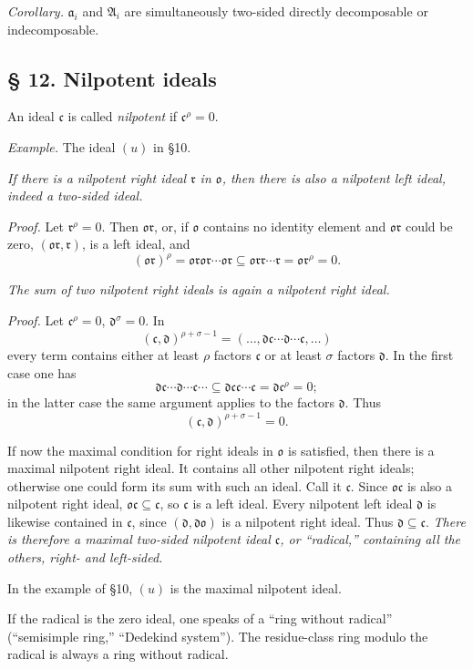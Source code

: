 \documentclass[11pt]{article}
\providecommand{\mA}{\mathfrak{A}}
\providecommand{\mo}{\mathfrak{o}}
\providecommand{\ma}{\mathfrak{a}}
\providecommand{\mc}{\mathfrak{c}}
\providecommand{\md}{\mathfrak{d}}
\providecommand{\mr}{\mathfrak{r}}
\begin{document}
\emph{Corollary.} $\ma_i$ and $\mA_i$ are simultaneously two-sided directly decomposable or indecomposable.

\subsection*{§ 12. Nilpotent ideals}

An ideal $\mc$ is called \emph{nilpotent} if $\mc^\rho=0$.

\emph{Example.} The ideal $(u)$ in §10.

\emph{If there is a nilpotent right ideal $\mr$ in $\mo$, then there is also a nilpotent left ideal, indeed a two-sided ideal.}

\emph{Proof.} Let $\mr^\rho=0$. Then $\mo\mr$, or, if $\mo$ contains no identity element and $\mo\mr$ could be zero, $(\mo\mr,\mr)$, is a left ideal, and
\[
        (\mo\mr)^\rho=\mo\mr\mo\mr\cdots\mo\mr\subseteq\mo\mr\mr\cdots\mr=\mo\mr^\rho=0.
\]

\emph{The sum of two nilpotent right ideals is again a nilpotent right ideal.}

\emph{Proof.} Let $\mc^\rho=0$, $\md^\sigma=0$. In
\[
        (\mc,\md)^{\rho+\sigma-1}=(\ldots,\md\mc\cdots\md\cdots\mc,\ldots)
\]
every term contains either at least $\rho$ factors $\mc$ or at least $\sigma$ factors $\md$. In the first case one has
\[
        \md\mc\cdots\md\cdots\mc\cdots\subseteq\md\mc\mc\cdots\mc=\md\mc^\rho=0;
\]
in the latter case the same argument applies to the factors $\md$. Thus
\[
        (\mc,\md)^{\rho+\sigma-1}=0.
\]

If now the maximal condition for right ideals in $\mo$ is satisfied, then there is a maximal nilpotent right ideal. It contains all other nilpotent right ideals; otherwise one could form its sum with such an ideal. Call it $\mc$. Since $\mo\mc$ is also a nilpotent right ideal, $\mo\mc\subseteq\mc$, so $\mc$ is a left ideal. Every nilpotent left ideal $\md$ is likewise contained in $\mc$, since $(\md,\md\mo)$ is a nilpotent right ideal. Thus $\md\subseteq\mc$. \emph{There is therefore a maximal two-sided nilpotent ideal $\mc$, or ``radical,'' containing all the others, right- and left-sided.}

In the example of §10, $(u)$ is the maximal nilpotent ideal.

If the radical is the zero ideal, one speaks of a ``ring without radical'' (``semisimple ring,'' ``Dedekind system''). The residue-class ring modulo the radical is always a ring without radical.
\end{document}
